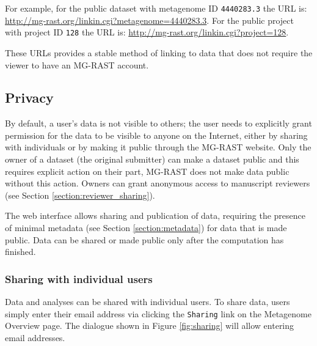 \documentclass[12pt,fullpage]{report}
\begin{document}
For example, for the public dataset with metagenome ID \texttt{4440283.3} the URL is:
\url{http://mg-rast.org/linkin.cgi?metagenome=4440283.3}.
For the public project with project ID  \texttt{128} the URL is:
\url{http://mg-rast.org/linkin.cgi?project=128}.

These URLs provides a stable method of linking to data that does not require the viewer to have an MG-RAST account.


\subsection*{Privacy}
\label{section:data-visibility}
By default, a user's data is not visible to others; the user needs to explicitly grant permission for the data to be visible to anyone on the Internet, either by sharing with individuals or by making it public through the MG-RAST website. Only the owner of a dataset (the original submitter) can make a dataset public and this requires explicit action on their part, MG-RAST does not make data public without this action.
Owners can grant anonymous access to manuscript reviewers  (see Section \ref{section:reviewer_sharing}).

The web interface allows sharing and publication of data, requiring the presence of minimal metadata
(see Section \ref{section:metadata}) for data that is made public.
Data can be shared or made public only after the computation has finished.
\subsubsection*{Sharing with individual users}
\label{section:user_sharing}
Data and analyses can be shared with individual users. To share data, users simply enter their email address via clicking the \texttt{Sharing} link on the Metagenome Overview page. The dialogue shown in Figure \ref{fig:sharing} will allow entering email addresses.
\end{document}
